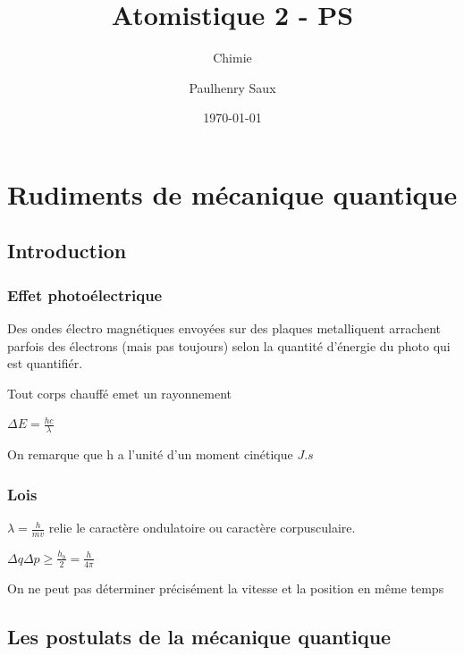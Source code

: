 \documentclass[french]{yLectureNote}
\title{Atomistique 2 - PS}
\subtitle{Chimie}
\author{Paulhenry Saux}
\date{\today}
\begin{document}
\chapter{Rudiments de mécanique quantique}
\section{Introduction}
\subsection{Effet photoélectrique}
\begin{definition}
Des ondes électro magnétiques envoyées sur des plaques metalliquent arrachent parfois des électrons (mais pas toujours) selon la quantité d'énergie du photo qui est quantifiér.
\end{definition}
\begin{theorem}
 Tout corps chauffé emet un rayonnement
\end{theorem}
\begin{theorem}
 \(\Delta E = \frac{hc}{\lambda}\)
\end{theorem}
On remarque que h a l'unité d'un moment cinétique \(J.s\)
\subsection{Lois}
\begin{theorem}
 \(\lambda = \frac{h}{mv}\) relie le caractère ondulatoire ou caractère corpusculaire.
\end{theorem}
\begin{theorem}
 \(\Delta q\Delta p \geq \frac{h_b}{2} = \frac{h}{4\pi}\)
\end{theorem}
On ne peut pas déterminer précisément la vitesse et la position en m\^eme temps
\section{Les postulats de la mécanique quantique}
\end{document}
